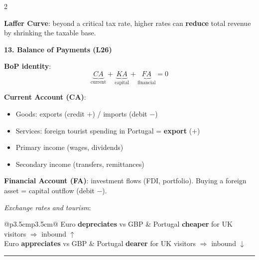\documentclass[9pt]{article}
\begin{document}
\begin{multicols}{2}
\begin{greenbox}
\smallskip
\textbf{Laffer Curve}: beyond a critical tax rate, higher rates can \textbf{reduce} total revenue by shrinking the taxable base.
\end{greenbox}

\begin{greenbox}
\textbf{\color{macro_green}13. Balance of Payments (L26)}

\smallskip
\textbf{BoP identity}:
\[
  \underbrace{CA}_{\text{current}} + \underbrace{KA}_{\text{capital}} + \underbrace{FA}_{\text{financial}} = 0
\]

\textbf{Current Account (CA)}:
\begin{itemize}[noitemsep, topsep=2pt, leftmargin=*]
  \item Goods: exports (credit $+$) / imports (debit $-$)
  \item Services: foreign tourist spending in Portugal = \textbf{export} ($+$)
  \item Primary income (wages, dividends)
  \item Secondary income (transfers, remittances)
\end{itemize}

\textbf{Financial Account (FA)}: investment flows (FDI, portfolio). Buying a foreign asset = capital outflow (debit $-$).

\smallskip
\textit{Exchange rates and tourism}:\\[2pt]
\begin{tabular}{@{}p{3.5cm}p{3.5cm}@{}}
Euro \textbf{depreciates} vs GBP & Portugal \textbf{cheaper} for UK visitors $\Rightarrow$ inbound $\uparrow$ \\[3pt]
Euro \textbf{appreciates} vs GBP & Portugal \textbf{dearer} for UK visitors $\Rightarrow$ inbound $\downarrow$ \\[3pt]
\end{tabular}
\end{greenbox}

\end{multicols}

\vspace{2pt}
\noindent\rule{\linewidth}{1pt}
\vspace{1pt}
\end{document}
